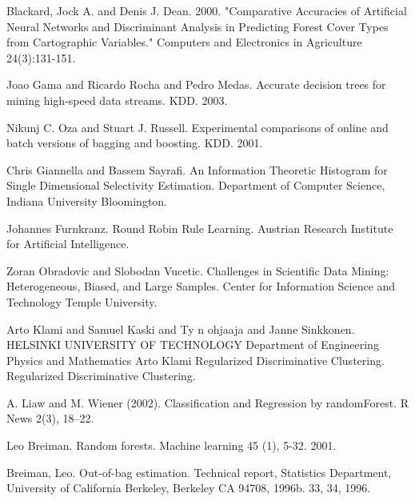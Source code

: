 \documentclass[11pt]{article}
\begin{document}
\pagebreak
\begin{thebibliography}{}
Blackard, Jock A. and Denis J. Dean. 2000. "Comparative Accuracies of Artificial Neural Networks and Discriminant Analysis in Predicting Forest Cover Types from Cartographic Variables." Computers and Electronics in Agriculture 24(3):131-151.

Joao Gama and Ricardo Rocha and Pedro Medas. Accurate decision trees for mining high-speed data streams. KDD. 2003.

Nikunj C. Oza and Stuart J. Russell. Experimental comparisons of online and batch versions of bagging and boosting. KDD. 2001.

Chris Giannella and Bassem Sayrafi. An Information Theoretic Histogram for Single Dimensional Selectivity Estimation. Department of Computer Science, Indiana University Bloomington.

Johannes Furnkranz. Round Robin Rule Learning. Austrian Research Institute for Artificial Intelligence.

Zoran Obradovic and Slobodan Vucetic. Challenges in Scientific Data Mining: Heterogeneous, Biased, and Large Samples. Center for Information Science and Technology Temple University.

Arto Klami and Samuel Kaski and Ty n ohjaaja and Janne Sinkkonen. HELSINKI UNIVERSITY OF TECHNOLOGY Department of Engineering Physics and Mathematics Arto Klami Regularized Discriminative Clustering. Regularized Discriminative Clustering.

A. Liaw and M. Wiener (2002). Classification and Regression by randomForest. R News 2(3), 18--22.

Leo Breiman. Random forests. Machine learning 45 (1), 5-32. 2001.

Breiman, Leo. Out-of-bag estimation. Technical report, Statistics Department, University of California Berkeley, Berkeley CA 94708, 1996b. 33, 34, 1996.

\end{thebibliography}
\end{document}
